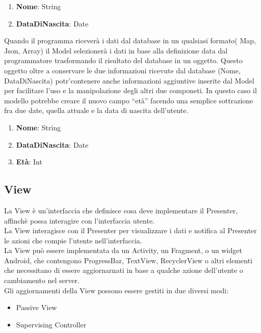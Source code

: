    \begin{enumerate}
   \item \textbf{Nome}: String
   \item \textbf{DataDiNascita}: Date
   \end{enumerate}

Quando il programma riceverà i dati dal database in un qualsiasi formato( Map, Json, Array) il Model selezionerà i dati in base alla definizione data dal programmatore trasformando il risultato del database in un oggetto. Questo oggetto oltre a conservare le due informazioni ricevute dal database (Nome, DataDiNascita) potr'\a contenere anche informazioni aggiuntive inserite dal Model per facilitare l'uso e la manipolazione degli altri due componeti.
In questo caso il modello potrebbe creare il nuovo campo ``età'' facendo una semplice sottrazione fra due date, quella attuale e la data di nascita dell'utente.

   \begin{enumerate}
   \item \textbf{Nome}: String
   \item \textbf{DataDiNascita}: Date
   \item \textbf{Età}: Int
   \end{enumerate}


   \subsection{View}
   La View è un'interfaccia che definisce cosa deve implementare il Presenter, affinchè possa interagire con l'interfaccia utente.\\
   La View interagisce con il Presenter per visualizzare i dati e notifica al Presenter le azioni che compie l'utente nell'interfaccia.\\
   La View può essere implementata da un Activity, un Fragment, o un widget Android, che contengono ProgressBar, TextView, RecyclerView o altri elementi che necessitano di essere aggiornarnati in base a qualche azione dell'utente o cambiamento nel server.\\
   Gli aggiornamenti della View possono essere gestiti in due diversi modi:
   \begin{itemize}
       \item Passive View
       \item Supervising Controller
   \end{itemize}

